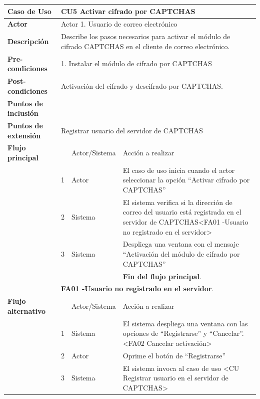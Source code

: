 \begin{longtable}[H]{| p{} | p{} |p{4cm}|p{5cm}|}
     \hline
     \textbf{Caso de Uso} &\multicolumn{3}{|l|}{CU5 Activar cifrado por CAPTCHAS}\\
     \hline
     \textbf{Actor} & \multicolumn{3}{|l|}{Actor 1. Usuario de correo electrónico}\\
     \hline
     \textbf{Descripción} & \multicolumn{3}{|p{10cm}|}{Describe los pasos necesarios para activar el módulo de cifrado CAPTCHAS en el cliente de correo electrónico.}\\
     \hline
     \textbf{Pre-condiciones} & \multicolumn{3}{|l|}{1. Instalar el módulo de cifrado por CAPTCHAS}\\
     \hline
     \textbf{Post-condiciones} & \multicolumn{3}{|l|}{Activación del cifrado y descifrado por CAPTCHAS.}\\
     \hline
     \textbf{Puntos de inclusión} & \multicolumn{3}{|l|}{}\\
     \hline
     \textbf{Puntos de extensión} & \multicolumn{3}{|l|}{Registrar usuario del servidor de CAPTCHAS}\\
     \hline
     \textbf{Flujo principal} & & Actor/Sistema & Acción a realizar\\
     \hline
     & 1 & Actor & El caso de uso inicia cuando el actor seleccionar la opción ``Activar cifrado por CAPTCHAS''\\
     \hline
     & 2 & Sistema & El sistema verifica si la dirección de correo del usuario está registrada en el servidor de CAPTCHAS<FA01 -Usuario no registrado en el servidor>\\
     \hline
     & 3 & Sistema & Despliega una ventana con el mensaje ``Activación del módulo de cifrado por CAPTCHAS''\\
     \hline
     & & & \textbf{Fin del flujo principal}.\\
     \hline
     & \multicolumn{3}{|l|}{\textbf{FA01 -Usuario no registrado en el servidor}.}\\
     \hline
     \textbf{Flujo alternativo} & & Actor/Sistema & Acción a realizar\\
     \hline
     & 1 & Sistema & El sistema despliega una ventana con las opciones de ``Registrarse'' y ``Cancelar''. <FA02 Cancelar activación>\\
     \hline
     & 2 & Actor & Oprime el botón de ``Registrarse''\\
     \hline
     & 3 & Sistema & El sistema invoca al caso de uso <CU Registrar usuario en el servidor de CAPTCHAS>\\

\end{longtable}
